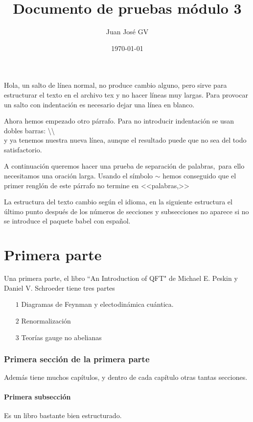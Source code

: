 \documentclass[a4paper,11pt]{article}
\begin{document}
\title{Documento de pruebas módulo 3}
\date{\today}
\author{Juan José GV}
\maketitle

Hola, un salto de línea normal, 
no produce cambio alguno, pero sirve para estructurar el texto en el archivo tex
y no hacer líneas muy largas. Para provocar un salto con indentación es necesario dejar una línea en blanco. 

Ahora hemos empezado otro párrafo. Para no introducir indentación se usan dobles barras: \textbackslash\textbackslash \\
y ya tenemos nuestra nueva línea, aunque el resultado puede que no sea del todo satisfactorio.

A continuación queremos hacer una prueba de separación de palabras,~para ello necesitamos una oración larga. Usando el símbolo $\sim$ hemos conseguido que el primer renglón de este párrafo no termine en <<palabras,>>

La estructura del texto cambio según el idioma, en la siguiente estructura el último punto después de los números de secciones y subsecciones no aparece si no se introduce el paquete babel con español.

\part{Primera parte}
Una primera parte, el libro ``An Introduction of QFT" de Michael E. Peskin y Daniel V. Schroeder tiene tres partes
\begin{itemize}
\item[$1$]Diagramas de Feynman y electodinámica cuántica.
\item[$2$]Renormalización
\item[$3$]Teorías gauge no abelianas
\end{itemize}

\section{Primera sección de la primera parte}
Además tiene muchos capítulos, y dentro de cada capítulo otras tantas secciones.
\subsection{Primera subsección}
Es un libro bastante bien estructurado.
\end{document}
